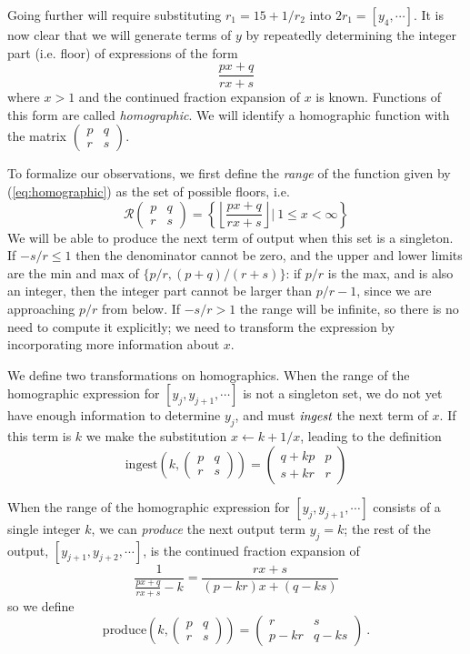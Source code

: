 \documentclass[11pt, oneside]{amsart}   	%
\newcommand{\pqrs}{\left(
\begin{smallmatrix} 
p & q\\ 
r & s 
\end{smallmatrix}
\right)}
\newcommand{\homographic}[4]{\begin{pmatrix} #1 & #2\\ #3 & #4 \end{pmatrix}}
\begin{document}
Going further will require substituting $r_1 = 15+1/r_2$ into $2r_1 = [y_4,\cdots]$.
It is now clear that we will generate terms of $y$ by repeatedly determining the integer part (i.e. floor) of expressions of the form
\begin{equation}\label{eq:homographic}
\frac{px+q}{rx+s}
\end{equation}
where $x>1$ and the continued fraction expansion of $x$ is known. Functions of this form are called \emph{homographic}.
We will identify a homographic function with the matrix
$\left(
\begin{smallmatrix} 
p & q\\ 
r & s 
\end{smallmatrix}
\right)$.

To formalize our observations, we first define the \emph{range} of the function given by (\ref{eq:homographic})
as the set of possible floors, i.e.
\[
\mathcal{R}\pqrs = \left\{ \left\lfloor \frac{px+q}{rx+s} \right\rfloor | \  1 \leq x < \infty \right\}
\]
We will be able to produce the next term of output when this set is a singleton. If $-s/r \leq 1$ then the denominator cannot be zero,
and the upper and lower limits are the min and max of $\{p/r, (p+q)/(r+s)\}$: if $p/r$ is the max, and is also an integer, then the
integer part cannot be larger than $p/r-1$, since we are approaching $p/r$ from below. If  $-s/r > 1$ the range will be infinite, so
there is no need to compute it explicitly; we need to transform the expression by incorporating more information about $x$.

We define two transformations on homographics. When the range of the homographic expression for $[y_j,y_{j+1},\cdots]$ is not a
singleton set, we do not yet have enough information to determine $y_j$, and must $\emph{ingest}$ the next term of $x$. If this term
is $k$ we make the substitution $x \leftarrow k + 1/x$, leading to the definition
\[
\mbox{ingest}(k,\pqrs) = \homographic{q+kp}{p}{s+kr}{r}%
\]

When the range of the homographic expression for $[y_j,y_{j+1},\cdots]$ consists of a single integer $k$, we can \emph{produce}
the next output term $y_j = k$; the rest of the output, $[y_{j+1},y_{j+2},\cdots]$, is the continued fraction expansion of
\[
\frac{1}{\frac{px+q}{rx+s}-k} = \frac{rx+s}{(p-kr)x + (q-ks)}
\] 
so we define 
\[
\mbox{produce}(k,\pqrs) = \homographic{r}{s}{p-kr}{q-ks}\ .
\]
\end{document}
